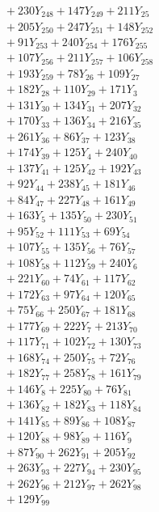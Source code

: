 \documentclass[a4paper,10pt]{article}
\begin{document}
{\begin{align}
&\quad  + 230Y_{248} + 147Y_{249} + 211Y_{25} \\[0.5ex]
&\quad  + 205Y_{250} + 247Y_{251} + 148Y_{252} \\[0.5ex]
&\quad  + 91Y_{253} + 240Y_{254} + 176Y_{255} \\[0.5ex]
&\quad  + 107Y_{256} + 211Y_{257} + 106Y_{258} \\[0.5ex]
&\quad  + 193Y_{259} + 78Y_{26} + 109Y_{27} \\[0.5ex]
&\quad  + 182Y_{28} + 110Y_{29} + 171Y_{3} \\[0.5ex]
&\quad  + 131Y_{30} + 134Y_{31} + 207Y_{32} \\[0.5ex]
&\quad  + 170Y_{33} + 136Y_{34} + 216Y_{35} \\[0.5ex]
&\quad  + 261Y_{36} + 86Y_{37} + 123Y_{38} \\[0.5ex]
&\quad  + 174Y_{39} + 125Y_{4} + 240Y_{40} \\[0.5ex]
&\quad  + 137Y_{41} + 125Y_{42} + 192Y_{43} \\[0.5ex]
&\quad  + 92Y_{44} + 238Y_{45} + 181Y_{46} \\[0.5ex]
&\quad  + 84Y_{47} + 227Y_{48} + 161Y_{49} \\[0.5ex]
&\quad  + 163Y_{5} + 135Y_{50} + 230Y_{51} \\[0.5ex]
&\quad  + 95Y_{52} + 111Y_{53} + 69Y_{54} \\[0.5ex]
&\quad  + 107Y_{55} + 135Y_{56} + 76Y_{57} \\[0.5ex]
&\quad  + 108Y_{58} + 112Y_{59} + 240Y_{6} \\[0.5ex]
&\quad  + 221Y_{60} + 74Y_{61} + 117Y_{62} \\[0.5ex]
&\quad  + 172Y_{63} + 97Y_{64} + 120Y_{65} \\[0.5ex]
&\quad  + 75Y_{66} + 250Y_{67} + 181Y_{68} \\[0.5ex]
&\quad  + 177Y_{69} + 222Y_{7} + 213Y_{70} \\[0.5ex]
&\quad  + 117Y_{71} + 102Y_{72} + 130Y_{73} \\[0.5ex]
&\quad  + 168Y_{74} + 250Y_{75} + 72Y_{76} \\[0.5ex]
&\quad  + 182Y_{77} + 258Y_{78} + 161Y_{79} \\[0.5ex]
&\quad  + 146Y_{8} + 225Y_{80} + 76Y_{81} \\[0.5ex]
&\quad  + 136Y_{82} + 182Y_{83} + 118Y_{84} \\[0.5ex]
&\quad  + 141Y_{85} + 89Y_{86} + 108Y_{87} \\[0.5ex]
&\quad  + 120Y_{88} + 98Y_{89} + 116Y_{9} \\[0.5ex]
&\quad  + 87Y_{90} + 262Y_{91} + 205Y_{92} \\[0.5ex]
&\quad  + 263Y_{93} + 227Y_{94} + 230Y_{95} \\[0.5ex]
&\quad  + 262Y_{96} + 212Y_{97} + 262Y_{98} \\[0.5ex]
&\quad  + 129Y_{99}\nonumber
\end{align}
}
\end{document}
